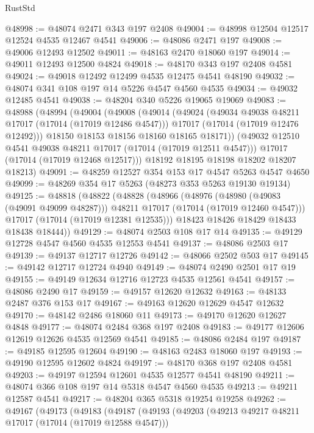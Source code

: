 \begin{lexlean}{RustStd}
\begin{coremodule}
{\begin{coremodule}
{{{{{{{{{{{{{{{{{{{{{{{{{{{{{{{{{{{{{{{{{{{{{{{{{{{{{{{@48998 := @48074 @2471 @343 @197 @2408
@49004 := @48998 @12504 @12517 @12524 @4535 @12467 @4541
@49006 := @48086 @2471 @197
@49008 := @49006 @12493 @12502
@49011 := @48163 @2470 @18060 @197
@49014 := @49011 @12493 @12500 @4824
@49018 := @48170 @343 @197 @2408 @4581
@49024 := @49018 @12492 @12499 @4535 @12475 @4541 @48190
@49032 := @48074 @341 @108 @197 @14 @5226 @4547 @4560 @4535
@49034 := @49032 @12485 @4541
@49038 := @48204 @340 @5226 @19065 @19069
@49083 := @48988
    (@48994
      (@49004
        (@49008
          (@49014
            (@49024
              (@49034 @49038 @48211 @17017 (@17014 (@17019 @12486 @4547)))
              @17017
              (@17014 (@17019 @12476 @12492)))
            @18150
            @18153
            @18156
            @18160
            @18165
            @18171))
        (@49032 @12510 @4541 @49038 @48211 @17017 (@17014 (@17019 @12511 @4547)))
        @17017
        (@17014 (@17019 @12468 @12517)))
      @18192
      @18195
      @18198
      @18202
      @18207
      @18213)
@49091 := @48259 @12527 @354 @153 @17 @4547 @5263 @4547 @4650
@49099 := @48269 @354 @17 @5263 (@48273 @353 @5263 @19130 @19134)
@49125 := @48818
    (@48822
      (@48828
        (@48966
          (@48976
            (@48980 (@49083 (@49091 @49099 @48287)))
            @48211
            @17017
            (@17014 (@17019 @12460 @4547)))
          @17017
          (@17014 (@17019 @12381 @12535)))
        @18423
        @18426
        @18429
        @18433
        @18438
        @18444))
@49129 := @48074 @2503 @108 @17 @14
@49135 := @49129 @12728 @4547 @4560 @4535 @12553 @4541
@49137 := @48086 @2503 @17
@49139 := @49137 @12717 @12726
@49142 := @48066 @2502 @503 @17
@49145 := @49142 @12717 @12724 @4940
@49149 := @48074 @2490 @2501 @17 @19
@49155 := @49149 @12634 @12716 @12723 @4535 @12561 @4541
@49157 := @48086 @2490 @17
@49159 := @49157 @12620 @12632
@49163 := @48133 @2487 @376 @153 @17
@49167 := @49163 @12620 @12629 @4547 @12632
@49170 := @48142 @2486 @18060 @11
@49173 := @49170 @12620 @12627 @4848
@49177 := @48074 @2484 @368 @197 @2408
@49183 := @49177 @12606 @12619 @12626 @4535 @12569 @4541
@49185 := @48086 @2484 @197
@49187 := @49185 @12595 @12604
@49190 := @48163 @2483 @18060 @197
@49193 := @49190 @12595 @12602 @4824
@49197 := @48170 @368 @197 @2408 @4581
@49203 := @49197 @12594 @12601 @4535 @12577 @4541 @48190
@49211 := @48074 @366 @108 @197 @14 @5318 @4547 @4560 @4535
@49213 := @49211 @12587 @4541
@49217 := @48204 @365 @5318 @19254 @19258
@49262 := @49167
    (@49173
      (@49183
        (@49187
          (@49193
            (@49203
              (@49213 @49217 @48211 @17017 (@17014 (@17019 @12588 @4547)))
}}}}}}}}}}}}}}}}}}}}}}}}}}}}}}}}}}}}}}}}}}}}}}}}}}}}}}}
\end{coremodule}}
\end{coremodule}
\end{lexlean}
